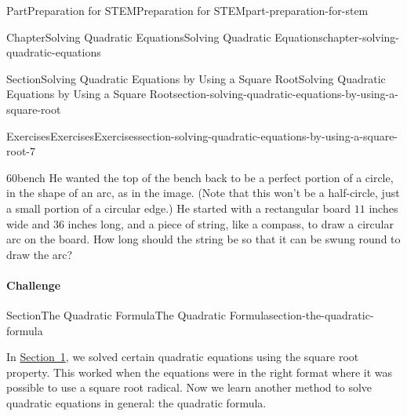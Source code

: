 \documentclass[twoside,10pt,]{book}
\newlength{\fillinmaxwidth}
\newlength{\fillincontract}
\newlength{\charmaxwidth}\setlength{\charmaxwidth}{0.5em}
\newlength{\charminwidth}\setlength{\charminwidth}{0.1em}
\newlength{\fillinheight}
\newcommand{\fillintext}[1]{%
\setlength{\fillinmaxwidth}{#1\charmaxwidth}%
\setlength{\fillincontract}{#1\charminwidth}%
\setlength{\fillinheight}{\baselineskip}\addtolength{\fillinheight}{1.2pt}%
{\color{fillintextshade}\strut\nobreak\leaders\vbox{\hrule width 0.3pt height \fillinheight \vskip -1.2pt}\hskip 1\fillinmaxwidth minus \fillincontract}%
}
\numberwithin{equation}{section}
\begin{document}
\begin{partptx}{Part}{Preparation for STEM}{}{Preparation for STEM}{}{}{part-preparation-for-stem}
\begin{chapterptx}{Chapter}{Solving Quadratic Equations}{}{Solving Quadratic Equations}{}{}{chapter-solving-quadratic-equations}
\begin{sectionptx}{Section}{Solving Quadratic Equations by Using a Square Root}{}{Solving Quadratic Equations by Using a Square Root}{}{}{section-solving-quadratic-equations-by-using-a-square-root}
\begin{exercises-subsection}{Exercises}{Exercises}{}{Exercises}{}{}{section-solving-quadratic-equations-by-using-a-square-root-7}
\begin{exercisegroup}
\begin{divisionexerciseeg}{60}{}{}{bench}
He wanted the top of the bench back to be a perfect portion of a circle, in the shape of an arc, as in the image. (Note that this won't be a half-circle, just a small portion of a circular edge.) He started with a rectangular board \(11\) inches wide and \(36\) inches long, and a piece of string, like a compass, to draw a circular arc on the board. How long should the string be so that it can be swung round to draw the arc?%
\end{divisionexerciseeg}%
\end{exercisegroup}
\par\medskip\noindent
\paragraph{Challenge}\hypertarget{section-solving-quadratic-equations-by-using-a-square-root-7-3}{}
%
\end{exercises-subsection}
\end{sectionptx}
%
%
\typeout{************************************************}
\typeout{************************************************}
%
\begin{sectionptx}{Section}{The Quadratic Formula}{}{The Quadratic Formula}{}{}{section-the-quadratic-formula}
\begin{introduction}{}%
In \hyperref[section-solving-quadratic-equations-by-using-a-square-root]{Section~1}, we solved certain quadratic equations using the square root property. This worked when the equations were in the right format where it was possible to use a square root radical. Now we learn another method to solve quadratic equations in general: the quadratic formula.%


\end{introduction}
\end{sectionptx}
\end{chapterptx}
\end{partptx}
\end{document}
